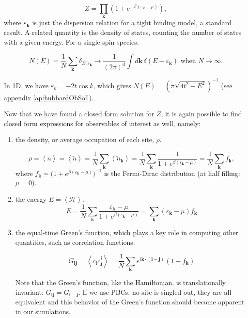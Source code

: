 \begin{equation}
Z = \prod_{\bm k} ( 1 + e^{-\beta (\varepsilon_{\bm k} - \mu )} ) ,
\end{equation}
where $\varepsilon_{\bm k}$ is just the dispersion relation for a tight binding model, a standard result.
A related quantity is the density of states, counting the number of states with a given energy. For a single spin species:

\begin{equation}
N ( E ) = \frac{1}{N} \sum_{\bm k} \delta_{E,\varepsilon_{\bm k}} \rightarrow \frac{1}{(2\pi)^d} \int d\bm k \, \delta ( E - \varepsilon_{\bm k})\,\, \text{when}\,\, N\rightarrow \infty.
\end{equation}

In \acs{1D}, we have $\varepsilon_{k} = - 2 t \cos k$, which gives $N(E) = ( \pi \sqrt{ 4 t^2 - E^2 } )^{-1}$ (see appendix \ref{ap:hubbardObSol}).

Now that we have found a closed form solution for $Z$, it is again possible to find closed form expressions for observables of interest as well, namely:

\begin{enumerate}
\item the density, or average occupation of each site, $\rho$.

\begin{equation}
\rho = \left\langle n \right\rangle = \left\langle \tilde{n} \right\rangle = \frac{1}{N} \sum_{{\bm k}} \left\langle \tilde{n}_{\bm k} \right\rangle  = \frac{1}{N} \sum_{\bm k}  \frac{1}{1 + e^{\beta (\varepsilon_{\bm k} - \mu)}} = \frac{1}{N} \sum_{\bm k}  f_{\bm k} ,
\end{equation}
where $f_{\bm k} = \big(1 + e^{\beta(\varepsilon_{\bm k} - \mu)} \big)^{-1}$ is the Fermi-Dirac distribution (at half filling: $\mu = 0$).

\item the energy $E = \left\langle \mathcal{H} \right\rangle$.
\begin{equation}
E = \frac{1}{N} \sum_{\bm k} \frac{\varepsilon_{\bm k} - \mu}{1 + e^{\beta(\varepsilon_{\bm k} - \mu)}} = \sum_{\bm k} (\varepsilon_{\bm k} - \mu) f_{\bm k}
\end{equation}

\item the equal-time Green's function, which plays a key role in computing other quantities, such as correlation functions.

\begin{equation}\label{eq:eqGreenNonInt}
G_{\bm l \bm j} = \left\langle c_{\bm l} c_{\bm j}^\dagger \right\rangle = \frac{1}{N} \sum_{\bm k} e^{ i {\bm k} \cdot ( \bm l -\bm  j ) } ( 1 - f_{\bm k} )
\end{equation}

Note that the Green's function, like the Hamiltonian, is translationally invariant: $G_{\bm l \bm j} = G_{\bm l-\bm j}$. 
If we use PBCs, no site is singled out, they are all equivalent and this behavior of the Green's function should become apparent in our simulations.
\end{enumerate}

